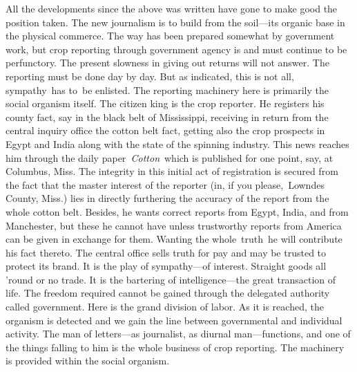 \documentclass[openany,nobib]{tufte-book}
\begin{document}
All the developments since the above was written have gone to make good
the position taken. The new journalism is to build from the soil---its
organic base in the physical commerce. The way has been prepared
somewhat by government work, but crop reporting through government
agency is and must continue to be perfunctory. The present slowness in
giving out returns will not answer. The reporting must be done day by
day. But as indicated, this is not all, sympathy~has to~be enlisted. The
reporting machinery here is primarily the social organism itself. The
citizen king is the crop reporter. He registers his county fact, say in
the black belt of Mississippi, receiving in return from the central
inquiry office the cotton belt fact, getting also the crop prospects in
Egypt and India along with the state of the spinning industry. This news
reaches him through the daily paper\emph{~Cotton}~which is published for
one point, say, at Columbus, Miss. The integrity in this initial act of
registration is secured from the fact that the master interest of the
reporter (in, if you please,~Lowndes County, Miss.) lies in directly
furthering the accuracy of the report from the whole cotton belt.
Besides, he wants correct reports from Egypt, India, and from
Manchester, but these he cannot have unless trustworthy reports from
America can be given in exchange for them. Wanting the whole~truth~he
will contribute his fact thereto. The central office sells truth for pay
and may be trusted to protect its brand. It is the play of sympathy---of
interest. Straight goods all 'round or no trade. It is the bartering of
intelligence---the great transaction of life. The freedom required
cannot be gained through the delegated authority called government. Here
is the grand division of labor. As it is reached, the organism is
detected and we gain the line between governmental and individual
activity. The man of letters---as journalist, as diurnal
man---functions, and one of the things falling to him is the whole
business of crop reporting. The machinery is provided within the social
organism.~

\enlargethispage{\baselineskip}
\end{document}
